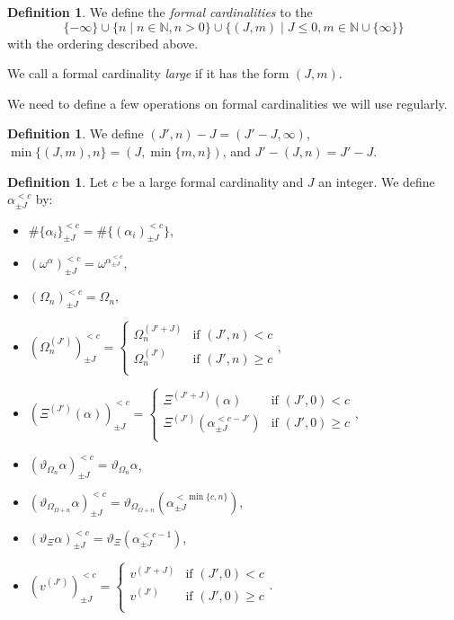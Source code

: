 \documentclass[11pt]{amsart}
\theoremstyle{definition}
\newtheorem{definition}[theorem]{Definition}
\begin{document}
\begin{definition}
  We define the \emph{formal cardinalities} to the
  \[\{-\infty\}\cup\{n\mid n\in\mathbb{N}, n>0\}\cup\{(J,m)\mid J\leq 0,m\in\mathbb{N}\cup\{\infty\}\}\]
  with the ordering described above.

  We call a formal cardinality \emph{large} if it has the form $(J,m)$.
\end{definition}








We need to define a few operations on formal cardinalities we will use regularly.
\begin{definition}
  We define $(J',n)-J=(J'-J,\infty)$, $\min\{(J,m),n\}=(J,\min\{m,n\})$, and $J'-(J,n)=J'-J$.
\end{definition}

\begin{definition}
Let $c$ be a large formal cardinality and $J$ an integer. We define $\alpha^{< c}_{\pm J}$ by:
  \begin{itemize}
  \item $\#\{\alpha_i\}^{< c}_{\pm J}=\#\{(\alpha_i) ^{< c}_{\pm J}\}$,
  \item $(\omega^\alpha) ^{<c}_{\pm J}=\omega^{\alpha^{<c}_{\pm J}}$,
  \item $(\Omega_n)^{<c}_{\pm J}=\Omega_n$,
  \item $(\Omega^{(J')}_n)^{<c}_{\pm J}=
    \left\{\begin{array}{ll}
             \Omega^{(J'+J)}_n&\text{if }(J',n)<c\\
             \Omega^{(J')}_n&\text{if }(J',n)\geq c\\
           \end{array}\right.$,
  \item $(\Xi^{(J')}(\alpha))^{< c}_{\pm J}=    \left\{\begin{array}{ll}
             \Xi^{(J'+J)}(\alpha)&\text{if }(J',0)<c\\
             \Xi^{(J')}(\alpha^{< c-J'}_{\pm J})&\text{if }(J',0)\geq c\\
           \end{array}\right.$,
  \item $(\vartheta_{\Omega_n}\alpha)^{<c}_{\pm J}=\vartheta_{\Omega_n}\alpha$,
  \item $(\vartheta_{\Omega_{\Omega+n}}\alpha)^{<c}_{\pm J}=\vartheta_{\Omega_{\Omega+n}}(\alpha^{<\min\{c,n\}}_{\pm J})$,
  \item $(\vartheta_\Xi\alpha)^{<c}_{\pm J}=\vartheta_\Xi(\alpha^{<c-1}_{\pm J})$,
  \item $(v^{(J')})^{<c}_{\pm J}=    \left\{\begin{array}{ll}
             v^{(J'+J)}&\text{if }(J',0)<c\\
             v^{(J')}&\text{if }(J',0)\geq c\\
           \end{array}\right.$.
  \end{itemize}
\end{definition}
\end{document}
